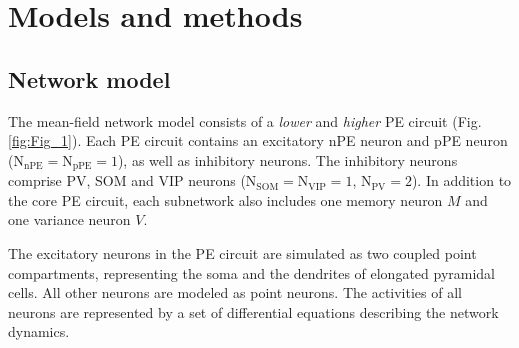 \documentclass[10pt,a4paper,draft]{article}
\begin{document}






\section*{Models and methods}
%
\subsection*{Network model}
The mean-field network model consists of a \textit{lower} and \textit{higher} PE circuit (Fig. \ref{fig:Fig_1}). Each PE circuit contains an excitatory nPE neuron and pPE neuron ($\mathrm{N}_\mathrm{nPE} = \mathrm{N}_\mathrm{pPE} = 1$), as well as inhibitory neurons. The inhibitory neurons comprise PV, SOM and VIP neurons ($\mathrm{N}_\mathrm{SOM} = \mathrm{N}_\mathrm{VIP} = 1$, $\mathrm{N}_\mathrm{PV} = 2$). In addition to the core PE circuit, each subnetwork also includes one memory neuron $M$ and one variance neuron $V$. 

The excitatory neurons in the PE circuit are simulated as two coupled point compartments, representing the soma and the dendrites of elongated pyramidal cells. All other neurons are modeled as point neurons. The activities of all neurons are represented by a set of differential equations describing the network dynamics. 
\end{document}
